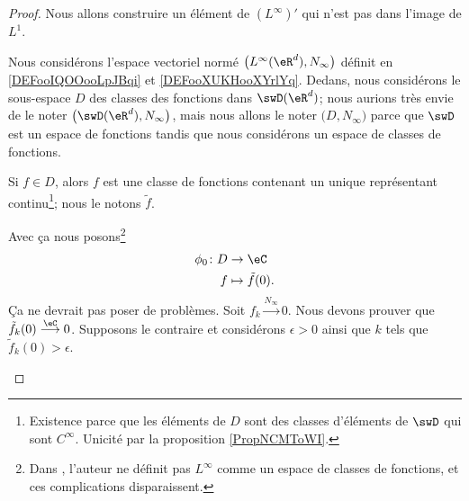 \begin{proof}
	Nous allons construire un élément de \( (L^{\infty})'\) qui n'est pas dans l'image de \( L^1\).

	\begin{subproof}
		Nous considérons l'espace vectoriel normé \( \big( L^{\infty}(\eR^d), N_{\infty} \big)\) définit en \ref{DEFooIQOOooLpJBqi} et \ref{DEFooXUKHooXYrlYq}. Dedans, nous considérons le sous-espace \( D\) des classes des fonctions dans \( \swD(\eR^d)\); nous aurions très envie de le noter \( \big( \swD(\eR^d), N_{\infty} \big)\), mais nous allons le noter \( \big( D,N_{\infty} \big)\) parce que \( \swD\) est un espace de fonctions tandis que nous considérons un espace de classes de fonctions.

		Si \( f\in D\), alors \( f\) est une classe de fonctions contenant un unique représentant continu\footnote{Existence parce que les éléments de \( D\) sont des classes d'éléments de \( \swD\) qui sont \(  C^{\infty}\). Unicité par la proposition \ref{PropNCMToWI}.}; nous le notons \( \tilde f\).


		Avec ça nous posons\footnote{Dans \cite{BIBooFDGQooYferue}, l'auteur ne définit pas \( L^{\infty}\) comme un espace de classes de fonctions, et ces complications disparaissent.}
		\begin{equation}
			\begin{aligned}
				\phi_0\colon D & \to \eC              \\
				f              & \mapsto \tilde f(0).
			\end{aligned}
		\end{equation}
		Ça ne devrait pas poser de problèmes.
		Soit \( f_k\stackrel{N_{\infty}}{\longrightarrow}0\). Nous devons prouver que \( \tilde f_k(0)\stackrel{\eC}{\longrightarrow}0\). Supposons le contraire et considérons \( \epsilon>0\) ainsi que \( k\) tels que \( \tilde f_k(0)>\epsilon\).


\end{subproof}
\end{proof}
